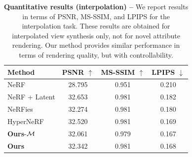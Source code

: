 \begin{table}
  \centering
  \begin{tabular}{@{}lccc@{}}
    \toprule
    Method                     & PSNR $\uparrow$ & MS-SSIM $\uparrow$ & LPIPS $\downarrow$ \\
    \midrule
    NeRF                       & 28.795          & 0.951              & 0.210              \\
    NeRF + Latent              & 32.653          & 0.981              & 0.182              \\
    NeRFies                    & 32.274          & 0.981              & 0.180              \\
    HyperNeRF                  & 32.520          & 0.981              & 0.169              \\
    \midrule
    \textbf{Ours}{-}$\mathcal{M}$ & 32.061          & 0.979              & 0.167              \\
    \textbf{Ours}              & 32.342          & 0.981              & 0.168              \\

    \bottomrule
  \end{tabular}
  \caption[Quantitative comparison between \conerf and baselines on real data]{
    \textbf{Quantitative results (interpolation) -- }
    We report results in terms of PSNR, MS-SSIM, and LPIPS for the interpolation
    task.
    These results are obtained for interpolated view synthesis only, not for novel
    attribute rendering.
    Our method provides similar performance in terms of rendering quality, but
    with controllability.
  } %
  \label{tab:conerf-sota}
\end{table}